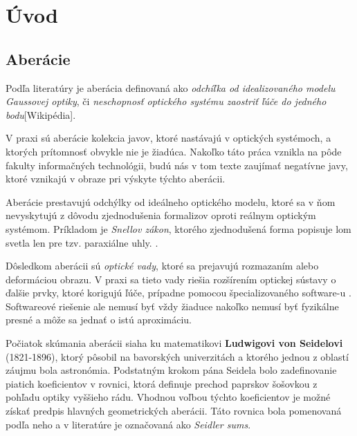 \chapter{Úvod}

\section{Aberácie}
Podľa literatúry je aberácia definovaná ako \textit{odchíľka od idealizovaného modelu Gaussovej
optiky}\cite{hechtoptics}, či \textit{neschopnosť optického systému zaostriť ľúče do jedného bodu}[Wikipédia].

V praxi sú aberácie kolekcia javov, ktoré nastávajú v optických systémoch, a ktorých prítomnosť
obvykle nie je žiadúca. Nakoľko táto práca vznikla na pôde fakulty informačných technológii, budú
nás v tom texte zaujímať negatívne javy, ktoré vznikajú v obraze pri výskyte týchto aberácii.

Aberácie prestavujú odchýlky od ideálneho optického modelu, ktoré sa v ňom nevyskytujú z dôvodu
zjednodušenia formalizov oproti reálnym optickým systémom. Príkladom je \textit{Snellov zákon},
ktorého zjednodušená forma popisuje lom svetla len pre tzv. paraxiálne uhly. \cite{hechtoptics}.

Dôsledkom aberácii sú \textit{optické vady}, ktoré sa prejavujú rozmazaním alebo deformáciou obrazu. V praxi sa tieto
vady riešia rozšírením optickej sústavy o ďalšie prvky, ktoré korigujú ľúče, prípadne pomocou
špecializovaného software-u \cite{automaticRemovalCA}. Softwareové riešenie ale nemusí byť vždy žiaduce nakoľko nemusí
byť fyzikálne presné a môže sa jednať o istú aproximáciu.

Počiatok skúmania aberácii siaha ku matematikovi \textbf{Ludwigovi von Seidelovi} (1821-1896), ktorý
pôsobil na bavorských univerzitách a ktorého jednou z oblastí záujmu bola astronómia. \cite{seidel}
Podstatným krokom pána Seidela bolo zadefinovanie piatich koeficientov v rovnici, ktorá definuje
prechod paprskov šošovkou z pohľadu optiky vyššieho rádu. Vhodnou voľbou týchto koeficientov je 
možné získať predpis hlavných geometrických aberácii. Táto rovnica bola pomenovaná podľa neho a 
v literatúre je označovaná ako \textit{Seidler sums}.

